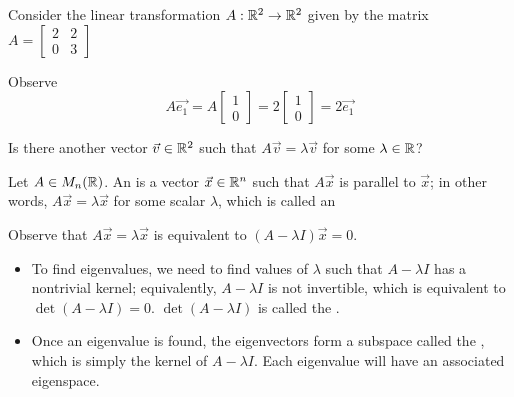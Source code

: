 
\begin{applicationActivities}{3}{27}

\begin{activity}{0}
Consider the linear transformation $A : \mathbb{R}^2 \rightarrow \mathbb{R}^2$ given by the matrix $A = \begin{bmatrix} 2 & 2 \\ 0 & 3 \end{bmatrix}$

\begin{center}
\end{center}
Observe $$A\vec{e_1} = A\begin{bmatrix}1 \\ 0 \end{bmatrix} = 2 \begin{bmatrix}1 \\ 0 \end{bmatrix} = 2 \vec{e_1}$$

Is there another vector $\vec{v} \in \mathbb{R}^2$ such that $A\vec{v}=\lambda \vec{v}$ for some $\lambda \in \mathbb{R}$?
\end{activity}

\begin{definition}Let $A \in M_n(\mathbb{R})$.
An  is a vector $\vec{x} \in \mathbb{R}^n$ such that $A\vec{x}$ is parallel to $\vec{x}$; in other words, $A\vec{x}=\lambda \vec{x}$ for some scalar $\lambda$, which is called an 
\end{definition}

\begin{observation}
Observe that $A\vec{x}=\lambda \vec{x}$ is equivalent to $(A-\lambda I)\vec{x} = 0$.
\begin{itemize}
\item To find eigenvalues, we need to find values of $\lambda$ such that $A-\lambda I$ has a nontrivial kernel; equivalently, $A-\lambda I$ is not invertible, which is equivalent to $\det(A-\lambda I)=0$.  $\det(A-\lambda I)$ is called the .
\item Once an eigenvalue is found, the eigenvectors form a subspace called the , which is simply the kernel of $A-\lambda I$.  Each eigenvalue will have an associated eigenspace.
\end{itemize}
\end{observation}


\end{applicationActivities}
